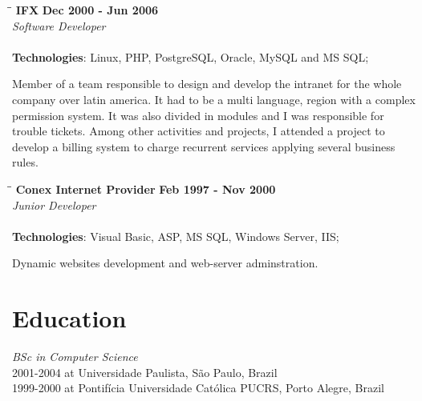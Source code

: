 \documentclass[margin]{res}
\begin{document}
\begin{resume}
\vspace{-0.1in}

\vspace{-0.1in}
   \begin{tabbing}
   \hspace{2.3in}\= \hspace{1.7in}\= \kill %
    \textbf{IFX}    \>\>\textbf{Dec 2000 - Jun 2006}\\
    \textit{Software Developer} \\ \\  
    \textbf{Technologies}: Linux, PHP, PostgreSQL, Oracle, MySQL and MS SQL;
   \end{tabbing}\vspace{-20pt}      %
    \vspace{2mm}
        Member of a team responsible to design and develop the intranet for the whole company over latin america. 
        It had to be a multi language, region with a complex permission system. It was also divided in modules and I was responsible for trouble tickets.
        Among other activities and projects, I attended a project to develop a billing system to charge recurrent services applying several business rules.
\vspace{-0.1in}

   \begin{tabbing}
   \hspace{2.3in}\= \hspace{1.7in}\= \kill %
    \textbf{Conex Internet Provider}    \>\>\textbf{Feb 1997 - Nov 2000}\\
    \textit{Junior Developer}\\ \\       
    \textbf{Technologies}: Visual Basic, ASP, MS SQL, Windows Server, IIS;
   \end{tabbing}\vspace{-20pt}      %
    \vspace{2mm}
      Dynamic websites development and web-server adminstration.  

\section{Education}	
      \textit{BSc in Computer Science} \\
            2001-2004 at Universidade Paulista, São Paulo, Brazil \\
            1999-2000 at Pontifícia Universidade Católica PUCRS, Porto Alegre, Brazil
      

\end{resume}
\end{document}
